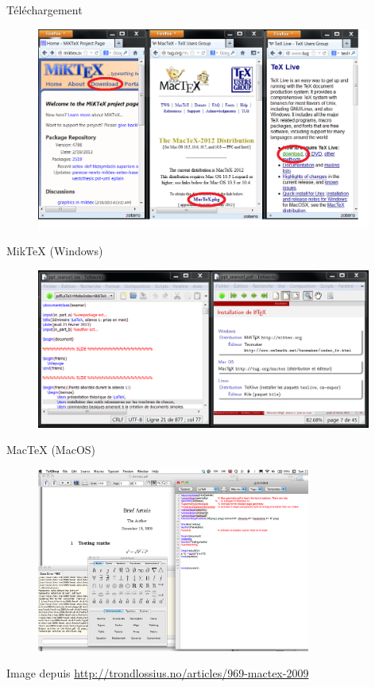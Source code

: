 \documentclass{beamer}
\begin{document}

\begin{frame}{Téléchargement}

\begin{figure}
\centering
\includegraphics[width=11cm]{img/fenetre_moz_log}
\end{figure}

\end{frame}


\begin{frame}{MikTeX (Windows)}

\begin{figure}
\centering
\includegraphics[width=11cm]{img/miktex_1}
\end{figure}

\end{frame}


\begin{frame}{MacTeX (MacOS)}

\begin{figure}
\centering
\includegraphics[width=9cm]{img/mactex_1}
\end{figure}

{\footnotesize Image depuis \url{http://trondlossius.no/articles/969-mactex-2009}}

\end{frame}
\end{document}
